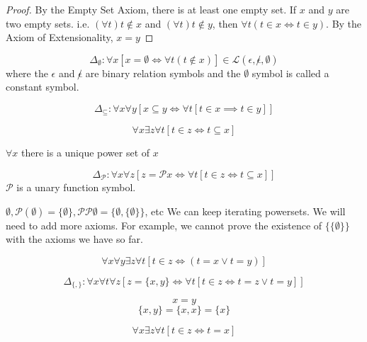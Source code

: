 \begin{proof}
By the Empty Set Axiom, there is at least one empty set. If $x$ and $y$ are two empty sets. i.e. $(\forall t) t \notin x$ and $(\forall t) t \notin y$, then $\forall t (t \in x \iff t \in y)$. By the Axiom of Extensionality, $x = y$
\end{proof}
\begin{defn}
\[\Delta_\emptyset : \forall x [x = \emptyset \iff \forall t (t \notin x)] \in \mathscr{L}(\epsilon, \not\epsilon, \emptyset)\]
where the $\epsilon$ and $\not\epsilon$ are binary relation symbols and the $\emptyset$ symbol is called a constant symbol.
\end{defn}
\begin{defn}
\[\Delta_{\subseteq}: \forall x \forall y [x \subseteq y \iff \forall t [t \in x \implies t \in y]]\]
\end{defn}
\begin{axiom}
\[\forall x \exists z \forall t [t \in z \iff t \subseteq x]\]    
\end{axiom}
\begin{prop}
    $\forall x$ there is a unique power set of $x$
\end{prop}
\begin{defn}
\[\Delta_{\mathcal{P}}: \forall x \forall z [z = \mathcal{P}x \iff \forall t [t \in z \iff t \subseteq x]]\]
$\mathcal{P}$ is a unary function symbol.
\end{defn}
\begin{ex}
$\emptyset, \mathcal{P}(\emptyset)= \{\emptyset\}, \mathcal{P}\mathcal{P}\emptyset = \{\emptyset, \{\emptyset\}\}$, etc
We can keep iterating powersets. We will need to add more axioms. For example, we cannot prove the existence of  $\{\{\emptyset\}\}$ with the axioms we have so far.
\end{ex}
\begin{axiom}
\[\forall x\forall y \exists z \forall t [t \in z \iff (t = x \vee t= y)]\]
\end{axiom}
\begin{defn}
\[\Delta_{\{,\}}: \forall x \forall t \forall z [z = \{x, y\} \iff \forall t [t \in z \iff t = z \vee t = y]] \]    
\end{defn}
\begin{ex}
\[x = y\]
\[\{x, y\} = \{x, x\} = \{x\}\]
\end{ex}
\begin{prop}
\[\forall x \exists z \forall t [t \in z \iff t = x]\]
\end{prop}
